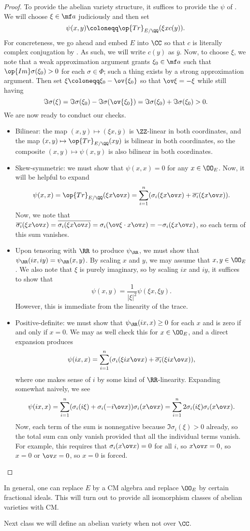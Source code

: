 \documentclass[../notes.tex]{subfiles}
\begin{document}
\begin{proof}
	To provide the abelian variety structure, it suffices to provide the $\psi$ of . We will choose $\xi\in\mf a$ judiciously and then set
	\[\psi(x,y)\coloneqq\op{Tr}_{E/\QQ}(\xi x c(y)).\]
	For concreteness, we go ahead and embed $E$ into $\CC$ so that $c$ is literally complex conjugation by . As such, we will write $c(y)$ as $\overline y$. Now, to choose $\xi$, we note that a weak approximation argument grants $\xi_0\in\mf a$ such that $\op{Im}\sigma(\xi_0)>0$ for each $\sigma\in\Phi$; such a thing exists by a strong approximation argument. Then set $\xi\coloneqq\xi_0-\ov{\xi_0}$ so that $\ov\xi=-\xi$ while still having
	\[\Im\sigma(\xi)=\Im\sigma(\xi_0)-\Im\sigma(\ov{\xi_0})=\Im\sigma(\xi_0)+\Im\sigma(\xi_0)>0.\]
	We are now ready to conduct our checks.
	\begin{itemize}
		\item Bilinear: the map $(x,y)\mapsto(\xi x,\overline y)$ is $\ZZ$-linear in both coordinates, and the map $(x,y)\mapsto\op{Tr}_{E/\QQ}(xy)$ is bilinear in both coordinates, so the composite $(x,y)\mapsto\psi(x,y)$ is also bilinear in both coordinates.
		\item Skew-symmetric: we must show that $\psi(x,x)=0$ for any $x\in\OO_E$. Now, it will be helpful to expand
		\[\psi(x,x)=\op{Tr}_{E/\QQ}(\xi x\ov x)=\sum_{i=1}^n(\sigma_i(\xi x\ov x)+\overline{\sigma_i}(\xi x\ov x)).\]
		Now, we note that $\overline{\sigma_i}(\xi x\ov x)=\overline{\sigma_i(\xi x\ov x)}=\sigma_i(\ov\xi\cdot x\ov x)=-\sigma_i(\xi x\ov x)$, so each term of this sum vanishes.
		\item Upon tensoring with $\RR$ to produce $\psi_\RR$, we must show that $\psi_\RR(ix,iy)=\psi_\RR(x,y)$. By scaling $x$ and $y$, we may assume that $x,y\in\OO_E$. We also note that $\xi$ is purely imaginary, so by scaling $ix$ and $iy$, it suffices to show that
		\[\psi(x,y)=\frac1{\left|\xi\right|^2}\psi(\xi x,\xi y).\]
		However, this is immediate from the linearity of the trace.
		\item Positive-definite: we must show that $\psi_\RR(ix,x)\ge0$ for each $x$ and is zero if and only if $x=0$. We may as well check this for $x\in\OO_E$, and a direct expansion produces
		\[\psi(ix,x)=\sum_{i=1}^n(\sigma_i(\xi ix\ov x)+\overline{\sigma_i}(\xi ix\ov x)),\]
		where one makes sense of $i$ by some kind of $\RR$-linearity. Expanding somewhat naively, we see
		\[\psi(ix,x)=\sum_{i=1}^n(\sigma_i(i\xi)+\sigma_i(-i\ov x))\sigma_i(x\ov x)=\sum_{i=1}^n2\sigma_i(i\xi)\sigma_i(x\ov x).\]
		Now, each term of the sum is nonnegative because $\Im\sigma_i(\xi)>0$ already, so the total sum can only vanish provided that all the individual terms vanish. For example, this requires that $\sigma_i(x\ov x)=0$ for all $i$, so $x\ov x=0$, so $x=0$ or $\ov x=0$, so $x=0$ is forced.
		\qedhere
	\end{itemize}
\end{proof}
\begin{remark}
	In general, one can replace $E$ by a CM algebra and replace $\OO_E$ by certain fractional ideals. This will turn out to provide all isomorphism classes of abelian varieties with CM.
\end{remark}
Next class we will define an abelian variety when not over $\CC$.
\end{document}

